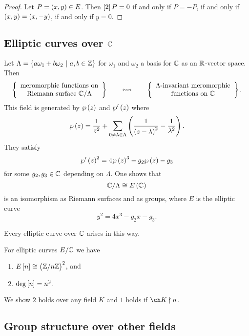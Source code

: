 \begin{proof}
Let $ P = \br{x, y} \in E $. Then $ \sbr{2}P = 0 $ if and only if $ P = -P $, if and only if $ \br{x, y} = \br{x, -y} $, if and only if $ y = 0 $.
\end{proof}

\subsection{Elliptic curves over \texorpdfstring{$ \mathbb{C} $}{C}}

Let $ \Lambda = \cbr{a\omega_1 + b\omega_2 \st a, b \in \ZZ} $ for $ \omega_1 $ and $ \omega_2 $ a basis for $ \mathbb{C} $ as an $ \mathbb{R} $-vector space. Then
$$ \correspondence{\text{meromorphic functions on} \\ \text{Riemann surface} \ \CC / \Lambda}{\text{$ \Lambda $-invariant meromorphic} \\ \text{functions on} \ \CC}. $$
This field is generated by $ \wp\br{z} $ and $ \wp'\br{z} $ where
$$ \wp\br{z} = \dfrac{1}{z^2} + \sum_{0 \ne \lambda \in \Lambda} \br{\dfrac{1}{\br{z - \lambda}^2} - \dfrac{1}{\lambda^2}}. $$
They satisfy
$$ \wp'\br{z}^2 = 4\wp\br{z}^3 - g_2\wp\br{z} - g_3 $$
for some $ g_2, g_3 \in \mathbb{C} $ depending on $ \Lambda $. One shows that
$$ \CC / \Lambda \cong E\br{\CC} $$
is an isomorphism as Riemann surfaces and as groups, where $ E $ is the elliptic curve
$$ y^2 = 4x^3 - g_2x - g_3. $$

\pagebreak

\begin{theorem}
Every elliptic curve over $ \mathbb{C} $ arises in this way.
\end{theorem}

For elliptic curves $ E / \mathbb{C} $ we have
\begin{enumerate}
\item $ E\sbr{n} \cong \br{\ZZ / n\ZZ}^2 $, and
\item $ \deg \sbr{n} = n^2 $.
\end{enumerate}
We show $ 2 $ holds over any field $ K $ and $ 1 $ holds if $ \ch K \nmid n $.

\subsection{Group structure over other fields}

